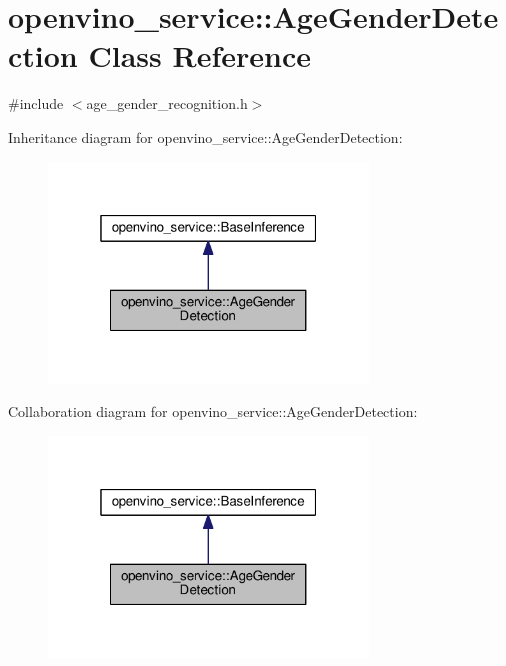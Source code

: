 \hypertarget{classopenvino__service_1_1AgeGenderDetection}{}\section{openvino\+\_\+service\+:\+:Age\+Gender\+Detection Class Reference}
\label{classopenvino__service_1_1AgeGenderDetection}


{\ttfamily \#include $<$age\+\_\+gender\+\_\+recognition.\+h$>$}



Inheritance diagram for openvino\+\_\+service\+:\+:Age\+Gender\+Detection\+:
\nopagebreak
\begin{figure}[H]
\begin{center}
\leavevmode
\includegraphics[width=241pt]{classopenvino__service_1_1AgeGenderDetection__inherit__graph}
\end{center}
\end{figure}


Collaboration diagram for openvino\+\_\+service\+:\+:Age\+Gender\+Detection\+:
\nopagebreak
\begin{figure}[H]
\begin{center}
\leavevmode
\includegraphics[width=241pt]{classopenvino__service_1_1AgeGenderDetection__coll__graph}
\end{center}
\end{figure}

